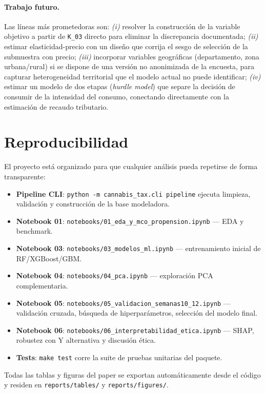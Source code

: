 \documentclass[12pt, a4paper]{article}
\begin{document}
\paragraph{Trabajo futuro.} Las líneas más prometedoras son: \emph{(i)} resolver la construcción de la variable objetivo a partir de \texttt{K\_03} directo para eliminar la discrepancia documentada; \emph{(ii)} estimar elasticidad-precio con un diseño que corrija el sesgo de selección de la submuestra con precio; \emph{(iii)} incorporar variables geográficas (departamento, zona urbana/rural) si se dispone de una versión no anonimizada de la encuesta, para capturar heterogeneidad territorial que el modelo actual no puede identificar; \emph{(iv)} estimar un modelo de dos etapas (\textit{hurdle model}) que separe la decisión de consumir de la intensidad del consumo, conectando directamente con la estimación de recaudo tributario.

\section{Reproducibilidad}

El proyecto está organizado para que cualquier análisis pueda repetirse de forma transparente:

\begin{itemize}
    \item \textbf{Pipeline CLI}: \texttt{python -m cannabis\_tax.cli pipeline} ejecuta limpieza, validación y construcción de la base modeladora.
    \item \textbf{Notebook 01}: \texttt{notebooks/01\_eda\_y\_mco\_propension.ipynb} — EDA y benchmark.
    \item \textbf{Notebook 03}: \texttt{notebooks/03\_modelos\_ml.ipynb} — entrenamiento inicial de RF/XGBoost/GBM.
    \item \textbf{Notebook 04}: \texttt{notebooks/04\_pca.ipynb} — exploración PCA complementaria.
    \item \textbf{Notebook 05}: \texttt{notebooks/05\_validacion\_semanas10\_12.ipynb} — validación cruzada, búsqueda de hiperparámetros, selección del modelo final.
    \item \textbf{Notebook 06}: \texttt{notebooks/06\_interpretabilidad\_etica.ipynb} — SHAP, robustez con Y alternativa y discusión ética.
    \item \textbf{Tests}: \texttt{make test} corre la suite de pruebas unitarias del paquete.
\end{itemize}

Todas las tablas y figuras del paper se exportan automáticamente desde el código y residen en \texttt{reports/tables/} y \texttt{reports/figures/}.
\end{document}
